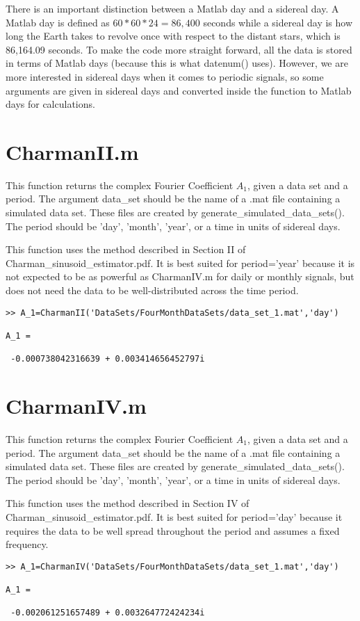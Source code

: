 \documentclass[12pt]{report}
\begin{document}
There is an important distinction between a Matlab day and a sidereal day.  A Matlab day is defined as $60*60*24=86,400$ seconds while a sidereal day is how long the Earth takes to revolve once with respect to the distant stars, which is 86,164.09 seconds.  To make the code more straight forward, all the data is stored in terms of Matlab days (because this is what datenum() uses).  However, we are more interested in sidereal days when it comes to periodic signals, so some arguments are given in sidereal days and converted inside the function to Matlab days for calculations.

\section{CharmanII.m}
This function returns the complex Fourier Coefficient $A_1$, given a data set and a period.  The argument data\_set should be the name of a .mat file containing a simulated data set.  These files are created by generate\_simulated\_data\_sets().  The period should be 'day', 'month', 'year', or a time in units of sidereal days.

This function uses the method described in Section II of Charman\_sinusoid\_estimator.pdf.  It  is best suited for period='year' because it is not expected to be as powerful as CharmanIV.m for daily or monthly signals, but does not need the data to be well-distributed across the time period.

\begin{verbatim}
>> A_1=CharmanII('DataSets/FourMonthDataSets/data_set_1.mat','day')

A_1 =

 -0.000738042316639 + 0.003414656452797i
\end{verbatim}

\section{CharmanIV.m}
This function returns the complex Fourier Coefficient $A_1$, given a data set and a period.  The argument data\_set should be the name of a .mat file containing a simulated data set.  These files are created by generate\_simulated\_data\_sets().  The period should be 'day', 'month', 'year', or a time in units of sidereal days.

This function uses the method described in Section IV of Charman\_sinusoid\_estimator.pdf.  It  is best suited for period='day' because it requires the data to be well spread throughout the period and assumes a fixed frequency.

\begin{verbatim}
>> A_1=CharmanIV('DataSets/FourMonthDataSets/data_set_1.mat','day')

A_1 =

 -0.002061251657489 + 0.003264772424234i
\end{verbatim}
\end{document}

